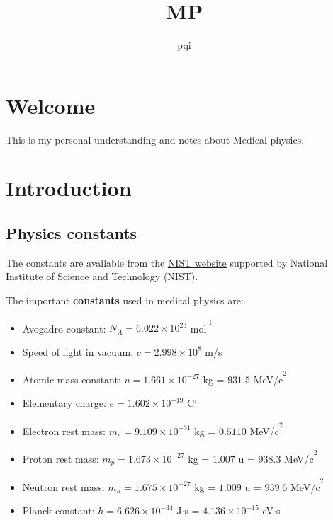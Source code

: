 \documentclass[]{book}
\title{MP}
\author{pqi}
\date{}
\providecommand{\tightlist}{%
  \setlength{\itemsep}{0pt}\setlength{\parskip}{0pt}}
\theoremstyle{definition}
\theoremstyle{definition}
\theoremstyle{definition}
\theoremstyle{remark}
\begin{document}
\maketitle

{
\hypersetup{linkcolor=black}
\setcounter{tocdepth}{1}
\tableofcontents
}
\chapter*{Welcome}\label{welcome}

This is my personal understanding and notes about Medical physics.

\chapter{Introduction}\label{introduction}

\hypertarget{constant}{\section{Physics constants}\label{constant}}

The constants are available from the
\href{http://physics.nist.gov/cuu/Constants/}{NIST website} supported by
National Institute of Science and Technology (NIST).

The important \textbf{constants} used in medical physics are:

\begin{itemize}
\tightlist
\item
  Avogadro constant: \(N_A = 6.022\times10^{23}\)
  mol\textsuperscript{\textsuperscript{-1}}
\item
  Speed of light in vacuum: \(c = 2.998\times10^8\) m/s
\item
  Atomic mass constant: \(u = 1.661\times10^{−27}\) kg = \(931.5\)
  MeV/c\textsuperscript{\textsuperscript{2}}
\item
  Elementary charge: \(e = 1.602\times10^{−19}\) C`
\item
  Electron rest mass: \(m_e = 9.109\times10^{−31}\) kg = \(0.5110\)
  MeV/c\textsuperscript{\textsuperscript{2}}
\item
  Proton rest mass: \(m_p = 1.673\times10^{−27}\) kg = \(1.007\) u =
  \(938.3\) MeV/c\textsuperscript{\textsuperscript{2}}
\item
  Neutron rest mass: \(m_n = 1.675\times10^{−27}\) kg = \(1.009\) u =
  \(939.6\) MeV/c\textsuperscript{\textsuperscript{2}}
\item
  Planck constant: \(h = 6.626×10^{−34}\) J\(\cdot\)s =
  \(4.136\times10^{−15}\) eV\(\cdot\)s
\end{itemize}
\end{document}
